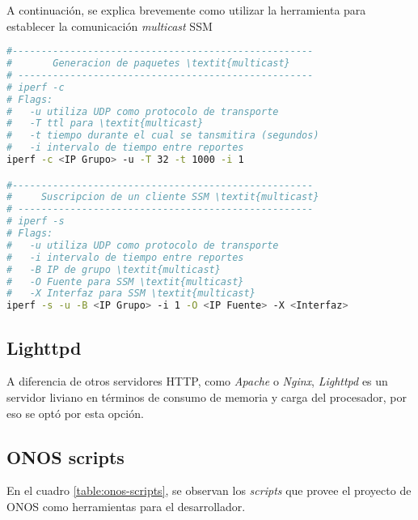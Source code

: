 A continuación, se explica brevemente como utilizar la herramienta para establecer la comunicación \textit{multicast} SSM


\begin{lstlisting}[language=bash, caption={Utilización de la herramienta iperf}, captionpos=b, label={lst:iperf}]
#---------------------------------------------------- 
#		Generacion de paquetes \textit{multicast}
# ---------------------------------------------------
# iperf -c 
# Flags:
#	-u utiliza UDP como protocolo de transporte
#	-T ttl para \textit{multicast}
#	-t tiempo durante el cual se tansmitira (segundos)
#	-i intervalo de tiempo entre reportes
iperf -c <IP Grupo> -u -T 32 -t 1000 -i 1

#---------------------------------------------------- 
#	  Suscripcion de un cliente SSM \textit{multicast}
# ---------------------------------------------------
# iperf -s
# Flags:
#	-u utiliza UDP como protocolo de transporte
#	-i intervalo de tiempo entre reportes
#	-B IP de grupo \textit{multicast}
#	-O Fuente para SSM \textit{multicast}
#	-X Interfaz para SSM \textit{multicast}
iperf -s -u -B <IP Grupo> -i 1 -O <IP Fuente> -X <Interfaz>
\end{lstlisting}







\subsection{Lighttpd}
A diferencia de otros servidores HTTP, como \textit{Apache} o \textit{Nginx}, \textit{Lighttpd} \parencite{lighttpd} es un servidor liviano en términos de consumo de memoria y carga del procesador, por eso se optó por esta opción.

\subsection{ONOS scripts}

En el cuadro \ref{table:onos-scripts}, se observan los \textit{scripts} que provee el proyecto de ONOS como herramientas para el desarrollador.

